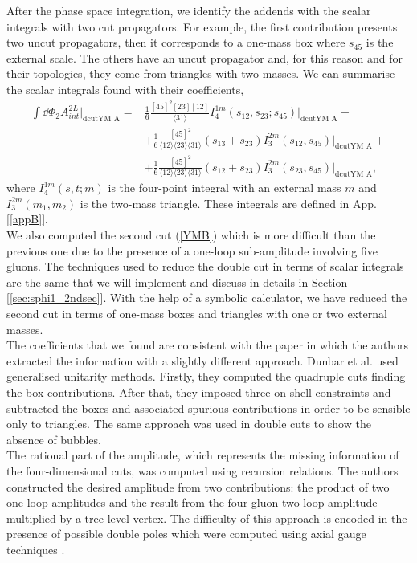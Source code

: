 After the phase space integration, we identify the addends with the scalar integrals with two cut propagators. For example, the first contribution presents two uncut propagators, then it corresponds to a one-mass box where $s_{45}$ is the external scale. The others have an uncut propagator and, for this reason and for their topologies, they come from triangles with two masses. We can summarise the scalar integrals found with their coefficients,\\
\begin{align*}
	\int \dd\Phi_2 A^{2L}_{int}|_{\text{dcutYM A}}=&\frac{1}{6}\frac{[45]^2[23][12]}{\langle 31 \rangle} I_4^{1m}(s_{12},s_{23};s_{45})|_{\text{dcutYM A}}+\\
	&+\frac{1}{6}\frac{[45]^2}{\langle 12 \rangle \langle 23 \rangle \langle 31 \rangle }(s_{13}+s_{23}) I_3^{2m}(s_{12},s_{45})|_{\text{dcutYM A}}+\\
	&+\frac{1}{6}\frac{[45]^2}{\langle 12 \rangle \langle 23 \rangle \langle 31 \rangle} (s_{12}+s_{23}) I_3^{2m}(s_{23},s_{45})|_{\text{dcutYM A}},
\end{align*}
where $I_4^{1m}(s,t;m)$ is the four-point integral with an external mass $m$ and $I_3^{2m}(m_1,m_2)$ is the two-mass triangle. These integrals are defined in App. [\ref{appB}].\\

We also computed the second cut (\ref{YMB}) which is more difficult than the previous one due to the presence of a one-loop sub-amplitude involving five gluons. The techniques used to reduce the double cut in terms of scalar integrals are the same that we will implement and discuss in details in Section [\ref{sec:sphi1_2ndsec}]. With the help of a symbolic calculator, we have reduced the second cut in terms of one-mass boxes and triangles with one or two external masses.\\

The coefficients that we found are consistent with the paper \cite{Dunbar_2016} in which the authors extracted the information with a slightly different approach. Dunbar et al. used generalised unitarity methods. Firstly, they computed the quadruple cuts finding the box contributions. After that, they imposed three on-shell constraints and subtracted the boxes and associated spurious contributions in order to be sensible only to triangles. The same approach was used in double cuts to show the absence of bubbles.\\

The rational part of the amplitude, which represents the missing information of the four-dimensional cuts, was computed using recursion relations. The authors constructed the desired amplitude from two contributions: the product of two one-loop amplitudes and the result from the four gluon two-loop amplitude multiplied by a tree-level vertex. The difficulty of this approach is encoded in the presence of possible double poles which were computed using axial gauge techniques \cite{Vaman_2008}.